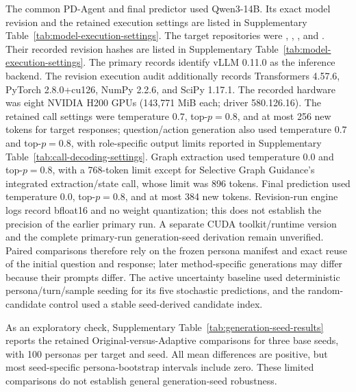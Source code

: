 \documentclass{ieeeaccess}
\begin{document}
The common PD-Agent and final predictor used Qwen3-14B. Its exact model revision and the
retained execution settings are listed in Supplementary Table~\ref{tab:model-execution-settings}.
The target repositories were
, ,
, and
. Their recorded revision hashes are listed in
Supplementary Table~\ref{tab:model-execution-settings}. The primary records identify
vLLM 0.11.0 as the inference backend. The revision execution audit additionally records
Transformers 4.57.6, PyTorch 2.8.0+cu126, NumPy 2.2.6, and SciPy 1.17.1.
The recorded hardware was eight NVIDIA H200 GPUs (143{,}771 MiB each; driver 580.126.16).
The retained call settings were temperature $0.7$, top-$p=0.8$,
and at most 256 new tokens for target responses; question/action generation also used
temperature $0.7$ and top-$p=0.8$, with role-specific output limits reported in
Supplementary Table~\ref{tab:call-decoding-settings}. Graph extraction used temperature
$0.0$ and top-$p=0.8$, with a 768-token limit except for Selective Graph Guidance's
integrated extraction/state call, whose limit was 896 tokens. Final prediction used
temperature $0.0$, top-$p=0.8$, and at most 384 new tokens. Revision-run engine logs
record bfloat16 and no weight quantization; this does not establish the precision of
the earlier primary run. A separate CUDA toolkit/runtime version and the complete
primary-run generation-seed derivation remain unverified.
Paired comparisons therefore rely on the frozen persona manifest and exact reuse of the
initial question and response; later method-specific generations may differ because their
prompts differ. The active uncertainty baseline used deterministic persona/turn/sample
seeding for its five stochastic predictions, and the random-candidate control used a stable
seed-derived candidate index.

As an exploratory check, Supplementary Table~\ref{tab:generation-seed-results} reports
the retained Original-versus-Adaptive comparisons for three base seeds, with 100 personas
per target and seed. All mean differences are positive, but most seed-specific
persona-bootstrap intervals include zero. These limited comparisons do not establish
general generation-seed robustness.
\end{document}
